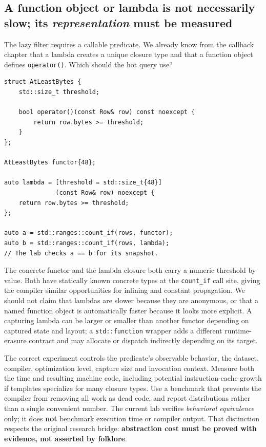 \subsection{\texorpdfstring{A function object or lambda is not necessarily slow; its \emph{representation} must be measured}{A function object or lambda is not necessarily slow; its representation must be measured}}\label{01-foundations-i-ch006-a-function-object-or-lambda-is-not-necessarily-slow-its-representation-must-be-measured}

The lazy filter requires a callable predicate. We already know from the callback chapter that a lambda creates a unique closure type and that a function object defines \texttt{operator()}. Which should the hot query use?

\begin{verbatim}
struct AtLeastBytes {
    std::size_t threshold;

    bool operator()(const Row& row) const noexcept {
        return row.bytes >= threshold;
    }
};

AtLeastBytes functor{48};

auto lambda = [threshold = std::size_t{48}]
              (const Row& row) noexcept {
    return row.bytes >= threshold;
};

auto a = std::ranges::count_if(rows, functor);
auto b = std::ranges::count_if(rows, lambda);
// The lab checks a == b for its snapshot.
\end{verbatim}

The concrete functor and the lambda closure both carry a numeric threshold by value. Both have statically known concrete types at the \texttt{count\_if} call site, giving the compiler similar opportunities for inlining and constant propagation. We should not claim that lambdas are slower because they are anonymous, or that a named function object is automatically faster because it looks more explicit. A capturing lambda can be larger or smaller than another functor depending on captured state and layout; a \texttt{std::function} wrapper adds a different runtime-erasure contract and may allocate or dispatch indirectly depending on its target.

The correct experiment controls the predicate's observable behavior, the dataset, compiler, optimization level, capture size and invocation context. Measure both the time and resulting machine code, including potential instruction-cache growth if templates specialize for many closure types. Use a benchmark that prevents the compiler from removing all work as dead code, and report distributions rather than a single convenient number. The current lab verifies \emph{behavioral equivalence} only; it does \textbf{not} benchmark execution time or compiler output. That distinction respects the original research bridge: \textbf{abstraction cost must be proved with evidence, not asserted by folklore}.


